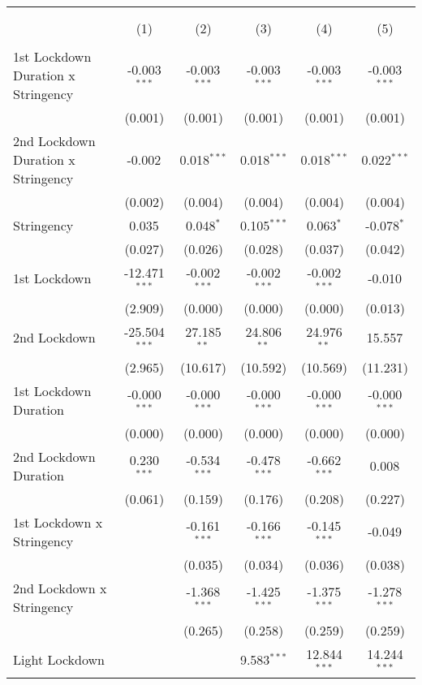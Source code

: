 \begin{tabular}{@{\extracolsep{5pt}}lccccc}
\\[-1.8ex]\hline
\hline \\[-1.8ex]
& \multicolumn{5}{c}{\textit{}} \
\cr \cline{5-6}
\\[-1.8ex] & (1) & (2) & (3) & (4) & (5) \\
\hline \\[-1.8ex]
 1st Lockdown Duration x Stringency & -0.003$^{***}$ & -0.003$^{***}$ & -0.003$^{***}$ & -0.003$^{***}$ & -0.003$^{***}$ \\
  & (0.001) & (0.001) & (0.001) & (0.001) & (0.001) \\
 2nd Lockdown Duration x Stringency & -0.002$^{}$ & 0.018$^{***}$ & 0.018$^{***}$ & 0.018$^{***}$ & 0.022$^{***}$ \\
  & (0.002) & (0.004) & (0.004) & (0.004) & (0.004) \\
 Stringency & 0.035$^{}$ & 0.048$^{*}$ & 0.105$^{***}$ & 0.063$^{*}$ & -0.078$^{*}$ \\
  & (0.027) & (0.026) & (0.028) & (0.037) & (0.042) \\
 1st Lockdown & -12.471$^{***}$ & -0.002$^{***}$ & -0.002$^{***}$ & -0.002$^{***}$ & -0.010$^{}$ \\
  & (2.909) & (0.000) & (0.000) & (0.000) & (0.013) \\
 2nd Lockdown & -25.504$^{***}$ & 27.185$^{**}$ & 24.806$^{**}$ & 24.976$^{**}$ & 15.557$^{}$ \\
  & (2.965) & (10.617) & (10.592) & (10.569) & (11.231) \\
 1st Lockdown Duration & -0.000$^{***}$ & -0.000$^{***}$ & -0.000$^{***}$ & -0.000$^{***}$ & -0.000$^{***}$ \\
  & (0.000) & (0.000) & (0.000) & (0.000) & (0.000) \\
 2nd Lockdown Duration & 0.230$^{***}$ & -0.534$^{***}$ & -0.478$^{***}$ & -0.662$^{***}$ & 0.008$^{}$ \\
  & (0.061) & (0.159) & (0.176) & (0.208) & (0.227) \\
 1st Lockdown x Stringency & & -0.161$^{***}$ & -0.166$^{***}$ & -0.145$^{***}$ & -0.049$^{}$ \\
  & & (0.035) & (0.034) & (0.036) & (0.038) \\
 2nd Lockdown x Stringency & & -1.368$^{***}$ & -1.425$^{***}$ & -1.375$^{***}$ & -1.278$^{***}$ \\
  & & (0.265) & (0.258) & (0.259) & (0.259) \\
 Light Lockdown & & & 9.583$^{***}$ & 12.844$^{***}$ & 14.244$^{***}$ \\

\end{tabular}

